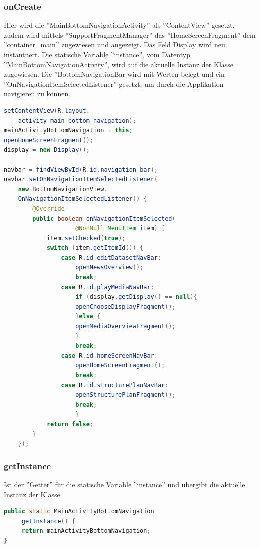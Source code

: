 \subsubsection{onCreate}
Hier wird die ''MainBottomNavigationActivity'' als ''ContentView'' gesetzt, zudem wird mittels ''SupportFragmentManager'' das ''HomeScreenFragment'' dem ''container\_main'' zugewiesen und angezeigt. Das Feld Display wird neu instantiiert. Die statische Variable ''instance'', vom Datentyp ''MainBottomNavigationActivity'', wird auf die aktuelle Instanz der Klasse zugewiesen. Die ''BottomNavigationBar wird mit Werten belegt und ein ''OnNavigationItemSelectedListener'' gesetzt, um durch die Applikation navigieren zu können.
\begin{lstlisting}[language=Java,caption={Zuweisung von Variablen und Navigationbar}]
setContentView(R.layout.
	activity_main_bottom_navigation);
mainActivityBottomNavigation = this;
openHomeScreenFragment();
display = new Display();
 
navbar = findViewById(R.id.navigation_bar);
navbar.setOnNavigationItemSelectedListener(
	new BottomNavigationView.
   	OnNavigationItemSelectedListener() {
    	@Override
     	public boolean onNavigationItemSelected(
     				@NonNull MenuItem item) {
     		item.setChecked(true);
        	switch (item.getItemId()) {
        		case R.id.editDatasetNavBar:
            		openNewsOverview();
                	break;
            	case R.id.playMediaNavBar:
                	if (display.getDisplay() == null){
                	openChooseDisplayFragment();
                	}else {
                	openMediaOverviewFragment();
                	}
                	break;
            	case R.id.homeScreenNavBar:
                	openHomeScreenFragment();
                	break;
            	case R.id.structurePlanNavBar:
                	openStructurePlanFragment();
                	break;
                	}
          	return false;
        }
	});
\end{lstlisting}	
\subsubsection{getInstance}
 Ist der ''Getter'' für die statische Variable ''instance'' und übergibt die aktuelle Instanz der Klasse.
\begin{lstlisting}[language=Java,caption={Getter für aktuelle Instanz der Activity}]
public static MainActivityBottomNavigation
	 getInstance() {
     return mainActivityBottomNavigation;
}
\end{lstlisting}
